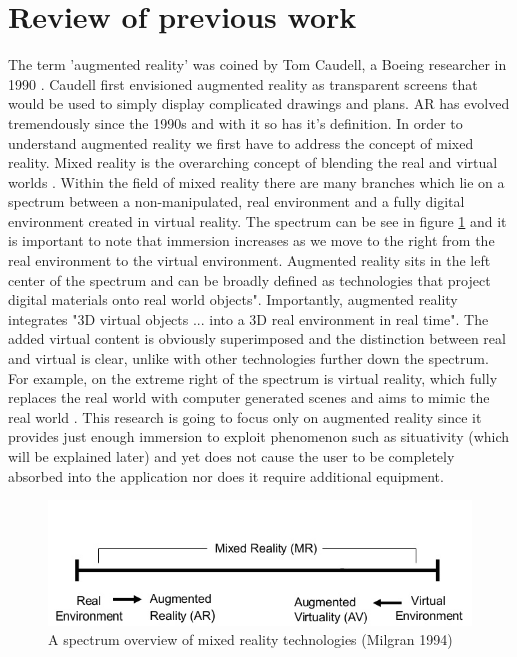 \documentclass{l4proj}
\begin{document}
\section{Review of previous work} \label{sec:litrew}
The term 'augmented reality' was coined by Tom Caudell, a Boeing researcher in 1990 \cite{rauterberg_history_2002}. Caudell first envisioned augmented reality as transparent screens that would be used to simply display complicated drawings and plans. AR has evolved tremendously since the 1990s and with it so has it's definition. In order to understand augmented reality we first have to address the concept of mixed reality. Mixed reality is the overarching concept of blending the real and virtual worlds \cite{milgram_taxonomy_1994}. Within the field of mixed reality there are many branches which lie on a spectrum between a non-manipulated, real environment and a fully digital environment created in virtual reality. The spectrum can be see in figure \ref{fig:ar-spectrum} and it is important to note that immersion increases as we move to the right from the real environment to the virtual environment. Augmented reality sits in the left center of the spectrum and can be broadly defined as technologies that project digital materials onto real world objects"\cite{cuendet_designing_2013}. Importantly, augmented reality integrates  "3D virtual objects ... into a 3D real environment in real time"\cite{azuma_survey_1997}. The added virtual content is obviously superimposed and the distinction between real and virtual is clear, unlike with other technologies further down the spectrum. For example, on the extreme right of the spectrum is virtual reality, which fully replaces the real world with computer generated scenes and aims to mimic the real world \cite{tamura_mixed_2001}. This research is going to focus only on augmented reality since it provides just enough immersion to exploit phenomenon such as situativity (which will be explained later) and yet does not cause the user to be completely absorbed into the application nor does it require additional equipment. 

\begin{figure}
\centering
\includegraphics[scale=1]{images/ar-spectrum.png}
\caption{A spectrum overview of mixed reality technologies (Milgran 1994)}
\label{fig:ar-spectrum}
\end{figure}
\end{document}
